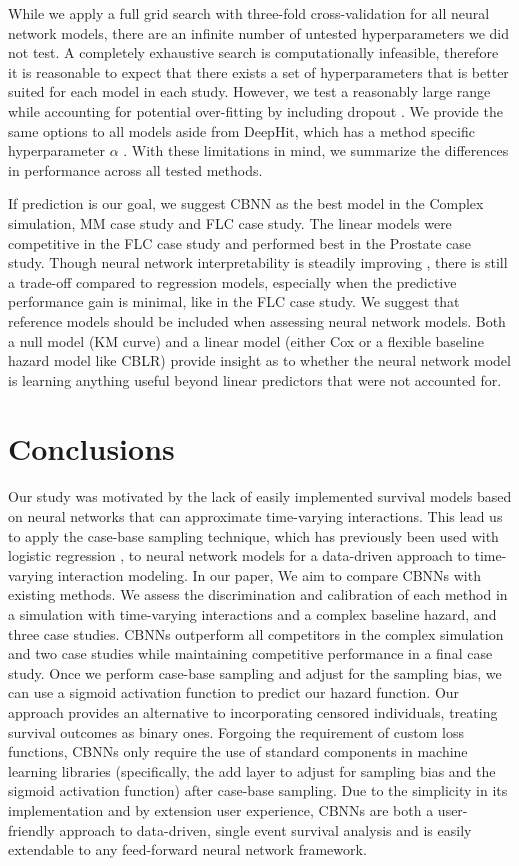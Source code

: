 \documentclass[preprint,12pt]{elsarticle}
\begin{document}
While we apply a full grid search with three-fold cross-validation for all neural network models, there are an infinite number of untested hyperparameters we did not test. A completely
exhaustive search is computationally infeasible, therefore it is reasonable to expect that there exists a set of hyperparameters that is better suited for each model
in each study. However, we test a reasonably large range while accounting for potential over-fitting by including dropout \citep{gulli2017}. We provide the same
options to all models aside from DeepHit, which has a method specific hyperparameter $\alpha$ \citep{lee2018DeepHit}. With these limitations in mind, we
summarize the differences in performance across all tested methods.

If prediction is our goal, we suggest CBNN as the best model in the Complex simulation, MM case study and FLC case study. The linear models were
competitive in the FLC case study and performed best in the Prostate case study. Though neural network interpretability is steadily improving \citep{interpret},
there is still a trade-off compared to regression models, especially when the predictive performance gain is minimal, like in the FLC case study. We suggest
that reference models should be included when assessing neural network models. Both a null model (KM curve) and a linear model (either Cox or a flexible
baseline hazard model like CBLR) provide insight as to whether the neural network model is learning anything useful beyond linear predictors that were
not accounted for.

\section{Conclusions}\label{sec5}

Our study was motivated by the lack of easily implemented survival models based on neural networks that can approximate time-varying interactions.
This lead us to apply the case-base sampling technique, which has previously been used with logistic regression \citep{hanley2009}, to neural network models for a data-driven
approach to time-varying interaction modeling. In our paper, We aim to compare CBNNs with existing methods. We assess the discrimination and calibration
of each method in a simulation with time-varying interactions and a complex baseline hazard, and three case studies. CBNNs outperform all competitors in
the complex simulation and two case studies while maintaining competitive performance in a final case study. Once we perform case-base sampling and
adjust for the sampling bias, we can use a sigmoid activation function to predict our hazard function. Our approach provides an alternative to incorporating
censored individuals, treating survival outcomes as binary ones. Forgoing the requirement of custom loss functions, CBNNs only require the use of standard
components in machine learning libraries (specifically, the add layer to adjust for sampling bias and the sigmoid activation function) after case-base sampling.
Due to the simplicity in its implementation and by extension user experience, CBNNs are both a user-friendly approach to data-driven, single event survival analysis and is
easily extendable to any feed-forward neural network framework.
\end{document}
